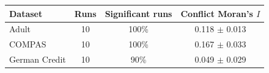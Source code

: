 \begin{tabular}{lccc}
\hline
Dataset & Runs & Significant runs & Conflict Moran's $I$ \\
\hline
Adult & 10 & 100\% & 0.118 $\pm$ 0.013 \\
COMPAS & 10 & 100\% & 0.167 $\pm$ 0.033 \\
German Credit & 10 & 90\% & 0.049 $\pm$ 0.029 \\
\hline
\end{tabular}